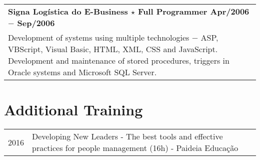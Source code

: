 \documentclass[a4paper, oneside, final]{scrartcl}
\newcommand{\vspc}{\vspace{0.15cm}} %
\newcommand{\vspcitem}{\vspace{0.1cm}} %
\begin{document}
\begin{center}
\begin{tabularx}{1\linewidth}{X}
{\bf Signa Logística do E-Business $\star$ Full Programmer \hfill Apr/2006 $-$ Sep/2006} \\
Development of systems using multiple technologies $-$ ASP, VBScript, Visual Basic, HTML, XML, CSS and JavaScript. Development and maintenance of stored procedures, triggers in Oracle systems and Microsoft SQL Server. \vspc\\
\end{tabularx}





\section{Additional Training}
\begin{tabularx}{1\linewidth}{p{2cm}X}
2016       &  Developing New Leaders - The best tools and effective practices for people management (16h) - Paideia Educação \vspcitem\\
\end{tabularx}


\end{center}
\end{document}
